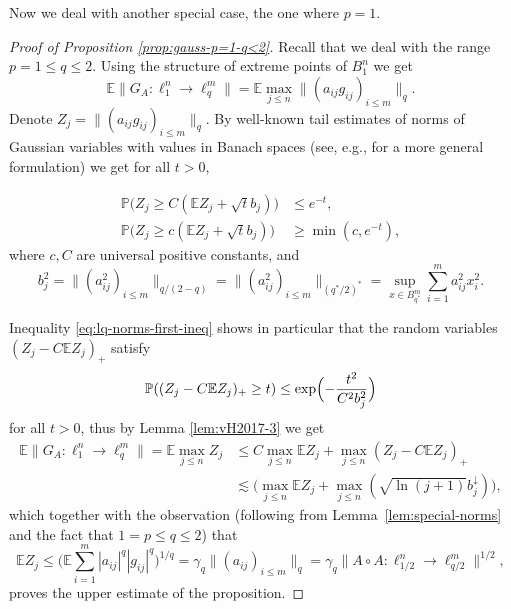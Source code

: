 \documentclass[a4paper]{amsart}
\theoremstyle{definition}
\theoremstyle{remark}
\numberwithin{equation}{section}
\newcommand*{\EE}{\mathbb{E}}
\newcommand*{\PP}{\mathbb{P}}
\newcommand*{\hadprod}{\mathbin{\circ}} %
\newcommand*{\rearr}{\downarrow} %
\begin{document}
Now we deal with another special case, the one where $p=1$.

\begin{proof}[Proof of Proposition \ref{prop:gauss-p=1-q<2}] Recall that we deal with the range $p=1\leq q\le 2$.
 Using the structure of extreme points of $B_1^n$
 we get 
\begin{displaymath}
  \EE \|G_A \colon \ell_1^n \to \ell_q^m\| = \EE \max_{j\le n} \|(a_{ij}g_{ij})_{i\le m}\|_q.
\end{displaymath}
Denote $Z_j =  \|(a_{ij}g_{ij})_{i\le m}\|_q$. By well-known tail estimates of norms of Gaussian variables with values in Banach spaces (see, e.g., \cite[Corollary 1]{MR1388035} for a more general formulation) we get for all $t > 0$,

\begin{align}
  \PP\bigl( Z_j \ge C(\EE Z_j + \sqrt{t} b_j)\bigr) &\le e^{-t},\label{eq:lq-norms-first-ineq} \\
  \PP\bigl( Z_j \ge c(\EE Z_j + \sqrt{t} b_j)\bigr) &\ge \min(c,e^{-t}), \label{eq:lq-norms}
\end{align}
where $c, C$ are universal positive constants, and
\begin{displaymath}
  b_j^2 = \|(a_{ij}^2)_{i\le m}\|_{q/(2-q)} =\| (a_{ij}^2)_{i\le m}\|_{(q^\ast/2)^\ast} =  \sup_{x\in B_{q^\ast}^m} \sum_{i=1}^m a_{ij}^2x_i^2.
\end{displaymath}

Inequality \eqref{eq:lq-norms-first-ineq} shows in particular that the random variables $(Z_j - C \EE Z_j)_+$ satisfy 
\begin{displaymath}
  \PP((Z_j - C \EE Z_j)_+ \ge t) \le \exp\Bigl(-\frac{t^2}{C^2 b_j^2}\Bigr)
\end{displaymath}
for all $t > 0$, thus by Lemma \ref{lem:vH2017-3} we get
\begin{align*}
  \EE \|G_A \colon \ell_1^n \to \ell_q^m\| = \EE \max_{j\le n} Z_j 
  &\le C \max_{j\le n} \EE Z_j + \max_{j\le n} (Z_j-C\EE Z_j)_+ \\
 &\lesssim \Big(\max_{j\le n} \EE Z_j + \max_{j\le n} (\sqrt{\ln(j+1)}b_j^{\rearr{}})\Big),
\end{align*}
which together with the observation (following from Lemma~\ref{lem:special-norms} and the fact that $1=p\leq q\leq 2$) that
\begin{displaymath}
  \EE Z_j \le \Big(\EE \sum_{i=1}^m |a_{ij}|^q |g_{ij}|^q\Big)^{1/q} 
  = \gamma_q \|(a_{ij})_{i\le m}\|_q 
  = \gamma_q \|A\hadprod A\colon \ell_{1/2}^n \to \ell_{q/2}^m\|^{1/2},
\end{displaymath}
proves the upper estimate of the proposition.


\end{proof}
\end{document}
